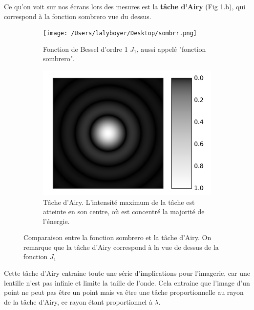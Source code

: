 Ce qu'on voit sur nos écrans lors des mesures est la \textbf{tâche d'Airy} (Fig 1.b), qui correspond à la fonction sombrero vue du dessus.

\begin{figure}[htbp]
    \centering
    \begin{subfigure}[b]{0.35\textwidth}
        \centering
        \texttt{[image: /Users/lalyboyer/Desktop/sombrr.png]}
        \caption{Fonction de Bessel d'ordre 1 $J_1$, aussi appelé "fonction sombrero".}
    \end{subfigure}
    \hspace*{3cm}
    \begin{subfigure}[b]{0.35\textwidth}
        \centering
        \includegraphics[width=\textwidth]{figures/airy_disk.png}
        \caption{Tâche d'Airy. L'intensité maximum de la tâche est atteinte en son centre, où est concentré la majorité de l'énergie.}
    \end{subfigure}
    \caption{Comparaison entre la fonction sombrero et la tâche d'Airy. On remarque que la tâche d'Airy correspond à la vue de dessus de la fonction $J_1$}
\end{figure}


Cette tâche d’Airy entraine toute une série d’implications pour l’imagerie, car une lentille n’est pas
infinie et limite la taille de l’onde. Cela entraine que l’image d’un point ne peut pas être un point mais
va être une tâche proportionnelle au rayon de la tâche d’Airy, ce rayon étant proportionnel à $\lambda$. %

